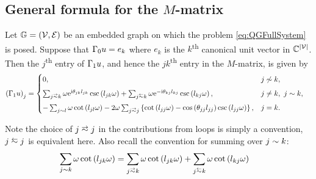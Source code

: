 \subsection{General formula for the $M$-matrix} \label{ssec:MMatrixResult}
\begin{prop} \label{prop:M-MatrixEntries}
	Let $\mathbb{G}=\left( \mathcal{V},\mathcal{E} \right)$ be an embedded graph on which the problem \eqref{eq:QGFullSystem} is posed.
	Suppose that $\Gamma_0 u = e_k$ where $e_k$ is the $k$\textsuperscript{th} canonical unit vector in $\mathbb{C}^{\left\lvert \mathcal{V} \right\rvert}$.
	Then the $j$\textsuperscript{th} entry of $\Gamma_1 u$, and hence the $jk$\textsuperscript{th} entry in the $M$-matrix, is given by
	\begin{align*}
		\bracs{\nmap u}_j &= 
		\begin{cases}
			0,	
			& j \not\con k, \\[5pt]
			\sum_{j\conLeft k} \omega \e^{\rmi\qm_{jk}l_{jk}} \csc\bracs{l_{jk}\omega} 
			+ \sum_{j\conRight k} \omega \e^{-\rmi\qm_{kj}l_{kj}} \csc\bracs{l_{kj}\omega},
			& j\neq k, \ j\con k, \\[5pt]
			- \sum_{j\con l} \omega\cot\bracs{l_{jl}\omega}
			- 2\omega\sum_{j\conLeft j} \clbracs{ \cot\bracs{l_{jj}\omega} - \cos\bracs{\qm_{jj}l_{jj}}\csc\bracs{l_{jj}\omega} },
			& j=k.
		\end{cases}
	\end{align*}
\end{prop}
Note the choice of $j\conLeft j$ in the contributions from loops is simply a convention, $j\conRight j$ is equivalent here.
Also recall the convention for summing over $j\sim k$:
\begin{align*}
	\sum_{j\con k} \omega\cot\bracs{l_{jk}\omega} &= \sum_{j\conLeft k} \omega\cot\bracs{l_{jk}\omega}	+ \sum_{j\conRight k} \omega\cot\bracs{l_{kj}\omega}
\end{align*}
